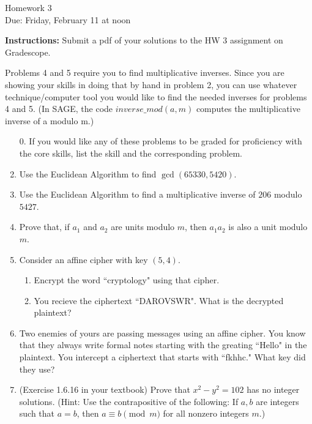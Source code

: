 \documentclass[12pt]{article}
\begin{document}
\begin{center}
{\Large Homework 3}\\
Due: Friday,  February 11 at noon\\


\end{center}
{\bf Instructions:} Submit a pdf of your solutions to the HW 3 assignment on Gradescope. 


 Problems 4 and 5 require you to find multiplicative inverses. Since you are showing your skills in doing that by hand in problem 2, you can use whatever technique/computer tool you would like to find the needed inverses for problems 4 and 5.  (In SAGE, the code $inverse\_mod(a,m)$ computes the multiplicative inverse of a modulo m.)

\begin{enumerate}
\item[0.] If you would like any of these problems to be graded for proficiency with the core skills, list the skill and the corresponding problem. 
\item Use the Euclidean Algorithm to find $\gcd(65330,5420)$.
\item Use the Euclidean Algorithm to find a multiplicative inverse of $206$ modulo $5427$. 
\item Prove that, if $a_1$ and $a_2$ are units modulo $m$, then $a_1a_2$ is also a unit modulo $m$. 
\item Consider an affine cipher with key $(5,4)$. 
\begin{enumerate}
\item Encrypt the word ``cryptology" using that cipher. 
\item You recieve the ciphertext ``DAROVSWR". What is the decrypted plaintext?
\end{enumerate}

\item Two enemies of yours are passing messages using an affine cipher. You know that they always write formal notes starting with the greating ``Hello" in the plaintext.  You intercept a ciphertext that starts with ``fkhhc." What key did they use?

\item (Exercise 1.6.16 in your textbook) Prove that $x^2-y^2=102$ has no integer solutions. (Hint: Use the contrapositive of the following: If $a,b$ are integers such that $a=b$, then $a\equiv b\pmod{m}$ for all nonzero integers $m$.)
\end{enumerate}
\end{document}
